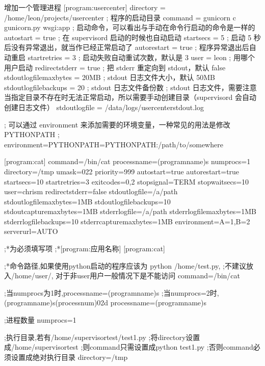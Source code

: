 \documentclass[a4paper,10pt,english]{sphinxmanual}
\begin{document}
\begin{itemize}
\begin{sphinxVerbatim}[commandchars=\\\{\}]
增加一个管理进程
[program:usercenter]
directory = /home/leon/projects/usercenter ; 程序的启动目录
command = gunicorn \PYGZhy{}c gunicorn.py wsgi:app  ; 启动命令，可以看出与手动在命令行启动的命令是一样的
autostart = true     ; 在 supervisord 启动的时候也自动启动
startsecs = 5        ; 启动 5 秒后没有异常退出，就当作已经正常启动了
autorestart = true   ; 程序异常退出后自动重启
startretries = 3     ; 启动失败自动重试次数，默认是 3
user = leon          ; 用哪个用户启动
redirect\PYGZus{}stderr = true  ; 把 stderr 重定向到 stdout，默认 false
stdout\PYGZus{}logfile\PYGZus{}maxbytes = 20MB  ; stdout 日志文件大小，默认 50MB
stdout\PYGZus{}logfile\PYGZus{}backups = 20     ; stdout 日志文件备份数
; stdout 日志文件，需要注意当指定目录不存在时无法正常启动，所以需要手动创建目录（supervisord 会自动创建日志文件）
stdout\PYGZus{}logfile = /data/logs/usercenter\PYGZus{}stdout.log

; 可以通过 environment 来添加需要的环境变量，一种常见的用法是修改 PYTHONPATH
; environment=PYTHONPATH=\PYGZdl{}PYTHONPATH:/path/to/somewhere

[program:cat]
command=/bin/cat
process\PYGZus{}name=\PYGZpc{}(program\PYGZus{}name)s
numprocs=1
directory=/tmp
umask=022
priority=999
autostart=true
autorestart=true
startsecs=10
startretries=3
exitcodes=0,2
stopsignal=TERM
stopwaitsecs=10
user=chrism
redirect\PYGZus{}stderr=false
stdout\PYGZus{}logfile=/a/path
stdout\PYGZus{}logfile\PYGZus{}maxbytes=1MB
stdout\PYGZus{}logfile\PYGZus{}backups=10
stdout\PYGZus{}capture\PYGZus{}maxbytes=1MB
stderr\PYGZus{}logfile=/a/path
stderr\PYGZus{}logfile\PYGZus{}maxbytes=1MB
stderr\PYGZus{}logfile\PYGZus{}backups=10
stderr\PYGZus{}capture\PYGZus{}maxbytes=1MB
environment=A=\PYGZdq{}1\PYGZdq{},B=\PYGZdq{}2\PYGZdq{}
serverurl=AUTO

;*为必须填写项
;*[program:应用名称]
[program:cat]

;*命令路径,如果使用python启动的程序应该为 python /home/test.py,
;不建议放入/home/user/, 对于非user用户一般情况下是不能访问
command=/bin/cat

;当numprocs为1时,process\PYGZus{}name=\PYGZpc{}(program\PYGZus{}name)s
;当numprocs\PYGZgt{}=2时,\PYGZpc{}(program\PYGZus{}name)s\PYGZus{}\PYGZpc{}(process\PYGZus{}num)02d
process\PYGZus{}name=\PYGZpc{}(program\PYGZus{}name)s

;进程数量
numprocs=1

;执行目录,若有/home/supervisor\PYGZus{}test/test1.py
;将directory设置成/home/supervisor\PYGZus{}test
;则command只需设置成python test1.py
;否则command必须设置成绝对执行目录
directory=/tmp


\end{sphinxVerbatim}
\end{itemize}
\end{document}
